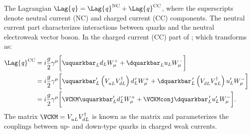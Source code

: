The Lagrangian $\Lag{\it q}=\Lag{\it q}^\mathrm{NC}+\Lag{\it q}^\mathrm{CC}$, where the
superscripts denote neutral current (NC) and charged current (CC) components.
The neutral current part characterizes interactions between quarks and the neutral electroweak
vector boson.
In the charged current (CC) part of ; which transforms as:
\begin{align}
  \Lag{\it q}^\mathrm{CC}
  &= i\frac{g}{2}\gamma^\mu
  \bigg[\uquarkbar_Ld_LW^+_\mu + \dquarkbar_Lu_LW^-_\mu
  \bigg]  \nonumber\\
  &= i\frac{g}{2}\gamma^\mu
  \bigg[
    \uquarkbar_L^\prime\left(V_{uL}^{\phantom{\dagger}}V_{dL}^\dagger\right)d_L^{\,\prime} W^+_\mu +
    \dquarkbar_L^{\,\prime}\left(V_{dL}^{\phantom{\dagger}}V_{uL}^\dagger\right)u_L^\prime W^-_\mu
  \bigg]  \nonumber\\
  &= i\frac{g}{2}\gamma^\mu
  \bigg[
    \VCKM\uquarkbar_L^\prime d_L^{\,\prime} W^+_\mu +
    \VCKMconj\dquarkbar_L^{\,\prime} u_L^\prime W^-_\mu
  \bigg].
\end{align}
The matrix $\VCKM=V^{\phantom{\dagger}}_{uL}V_{dL}^\dagger$ is known as the \ckm
matrix and parameterizes the couplings between up- and down-type quarks in charged weak currents.



